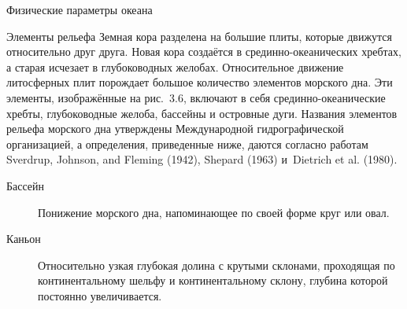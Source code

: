 \begin{chapter}{Физические параметры океана}
\begin{section}{Элементы рельефа}
Земная кора разделена на большие плиты, которые движутся относительно
друг друга. Новая кора создаётся в срединно-океанических хребтах, а
старая исчезает в глубоководных желобах. Относительное движение
литосферных плит порождает большое количество элементов морского
дна. Эти элементы, изображённые на рис.~3.6, включают в себя
срединно-океанические хребты, глубоководные желоба, бассейны и островные дуги.
Названия элементов рельефа морского дна утверждены Международной
гидрографической организацией, а определения, приведенные ниже, даются 
согласно работам Sverdrup, Johnson, and Fleming (1942), Shepard (1963)
и~Dietrich et al. (1980).
%


\begin{description}
\item[Бассейн] 
Понижение морского дна, напоминающее по своей форме круг или овал.
%

\item[Каньон]
Относительно узкая глубокая долина с крутыми склонами, проходящая по
континентальному шельфу и континентальному склону, глубина
которой постоянно увеличивается.
%


\end{description}
\end{section}
\end{chapter}
